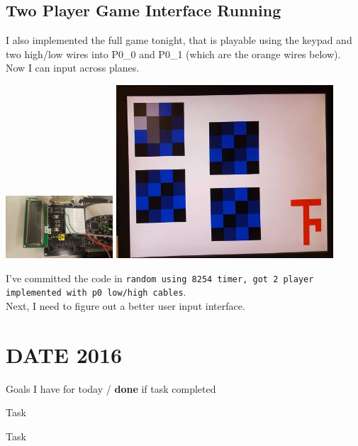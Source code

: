 \documentclass[12pt,twoside]{article}
\newenvironment{tight_itemize}{
\begin{itemize}
  \setlength{\itemsep}{0pt}
  \setlength{\parskip}{0pt}
}{\end{itemize}}
\begin{document}
\subsection{Two Player Game Interface Running}
I also implemented the full game tonight, that is playable using the keypad and two high/low wires into P0\_0 and P0\_1 (which are the orange wires below). Now I can input across planes. 
\begin{center}
\includegraphics[width = 40mm]{Pics/5-4c.jpg}
\includegraphics[width = 81mm]{Pics/5-4a.jpg}
\end{center}
I've committed the code in \texttt{random using 8254 timer, got 2 player implemented with p0 low/high cables}. 
\\ Next, I need to figure out a better user input interface. 


\newpage
\section{DATE 2016}

Goals I have for today / {\bf done} if task completed
\begin{tight_itemize}
\item Task %
\item Task 
\end{tight_itemize}
\end{document}
